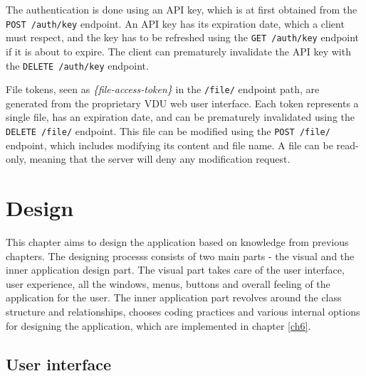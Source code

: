 The authentication is done using an API key, which is at first obtained from the \lstinline{POST /auth/key} endpoint. An API key has its expiration date, which a client must respect, and the key has to be refreshed using the \lstinline{GET /auth/key} endpoint if it is about to expire. The client can prematurely invalidate the API key with the \lstinline{DELETE /auth/key} endpoint.

File tokens, seen as \textit{\{file-access-token\}} in the \lstinline{/file/} endpoint path, are generated from the proprietary VDU web user interface. Each token represents a single file, has an expiration date, and can be prematurely invalidated using the \lstinline{DELETE /file/} endpoint. This file can be modified using the \lstinline{POST /file/} endpoint, which includes modifying its content and file name. A file can be read-only, meaning that the server will deny any modification request.


\chapter{Design}
\label{ch5}
This chapter aims to design the application based on knowledge from previous chapters. The designing processs consists of two main parts - the visual and the inner application design part. The visual part takes care of the user interface, user experience, all the windows, menus, buttons and overall feeling of the application for the user. The inner application part revolves around the class structure and relationships, chooses coding practices and various internal options for designing the application, which are implemented in chapter \ref{ch6}.

\section{User interface}


